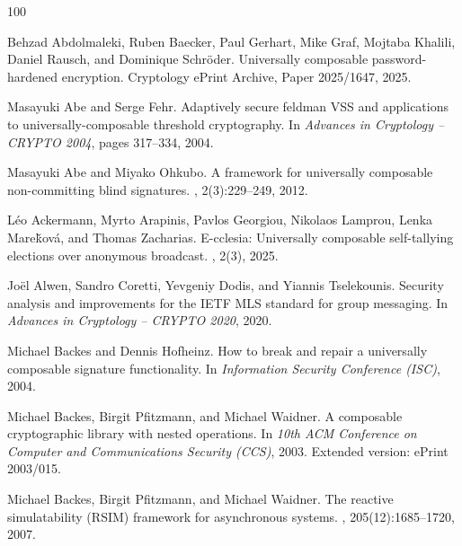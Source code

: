 \documentclass[11pt,a4paper]{article}
\begin{document}
\begin{thebibliography}{100}

Behzad Abdolmaleki, Ruben Baecker, Paul Gerhart, Mike Graf, Mojtaba Khalili,
  Daniel Rausch, and Dominique Schr{\"o}der.
\newblock Universally composable password-hardened encryption.
\newblock Cryptology ePrint Archive, Paper 2025/1647, 2025.

Masayuki Abe and Serge Fehr.
\newblock Adaptively secure feldman {VSS} and applications to
  universally-composable threshold cryptography.
\newblock In {\em Advances in Cryptology -- CRYPTO 2004}, pages 317--334, 2004.

Masayuki Abe and Miyako Ohkubo.
\newblock A framework for universally composable non-committing blind
  signatures.
, 2(3):229--249,
  2012.

L{\'e}o Ackermann, Myrto Arapinis, Pavlos Georgiou, Nikolaos Lamprou, Lenka
  Mare{\v k}ov{\'a}, and Thomas Zacharias.
\newblock E-cclesia: Universally composable self-tallying elections over
  anonymous broadcast.
, 2(3), 2025.

Jo{\"e}l Alwen, Sandro Coretti, Yevgeniy Dodis, and Yiannis Tselekounis.
\newblock Security analysis and improvements for the {IETF} {MLS} standard for
  group messaging.
\newblock In {\em Advances in Cryptology -- CRYPTO 2020}, 2020.

Michael Backes and Dennis Hofheinz.
\newblock How to break and repair a universally composable signature
  functionality.
\newblock In {\em Information Security Conference (ISC)}, 2004.

Michael Backes, Birgit Pfitzmann, and Michael Waidner.
\newblock A composable cryptographic library with nested operations.
\newblock In {\em 10th ACM Conference on Computer and Communications Security
  (CCS)}, 2003.
\newblock Extended version: ePrint 2003/015.

Michael Backes, Birgit Pfitzmann, and Michael Waidner.
\newblock The reactive simulatability ({RSIM}) framework for asynchronous
  systems.
, 205(12):1685--1720, 2007.


\end{thebibliography}
\end{document}
